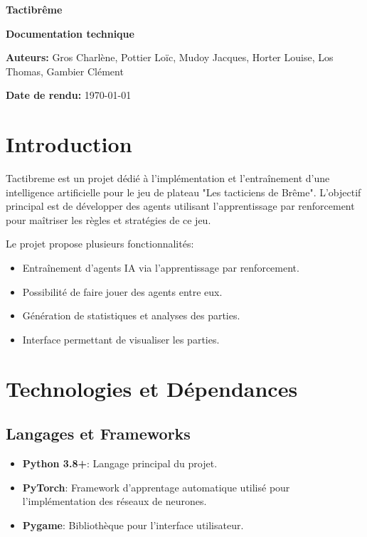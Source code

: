\documentclass[]{article}
\begin{document}
\begin{titlepage}
  \centering

  \vspace*{4cm}

  \Huge
  \textbf{Tactibrême}

  \vspace{1cm}

  \huge
  \textbf{Documentation technique}

  \vfill

  \Large
  \textbf{Auteurs:} Gros Charlène, Pottier Loïc, Mudoy Jacques, Horter Louise, Los Thomas, Gambier Clément

  \vspace{1cm}

  \textbf{Date de rendu:} \today

\end{titlepage}

\tableofcontents

\newpage

\section{Introduction}

Tactibreme est un projet dédié à l'implémentation et l'entraînement d'une intelligence artificielle pour le jeu de plateau "Les tacticiens de Brême". L'objectif principal est de développer des agents utilisant l'apprentissage par renforcement pour maîtriser les règles et stratégies de ce jeu.

Le projet propose plusieurs fonctionnalités:
\begin{itemize}
  \item Entraînement d'agents IA via l'apprentissage par renforcement.
  \item Possibilité de faire jouer des agents entre eux.
  \item Génération de statistiques et analyses des parties.
  \item Interface permettant de visualiser les parties.
\end{itemize}

\section{Technologies et Dépendances}

\subsection{Langages et Frameworks}
\begin{itemize}
  \item \textbf{Python 3.8+}: Langage principal du projet.
  \item \textbf{PyTorch}: Framework d'apprentage automatique utilisé pour l'implémentation des réseaux de neurones.
  \item \textbf{Pygame}: Bibliothèque pour l'interface utilisateur.
\end{itemize}
\end{document}

